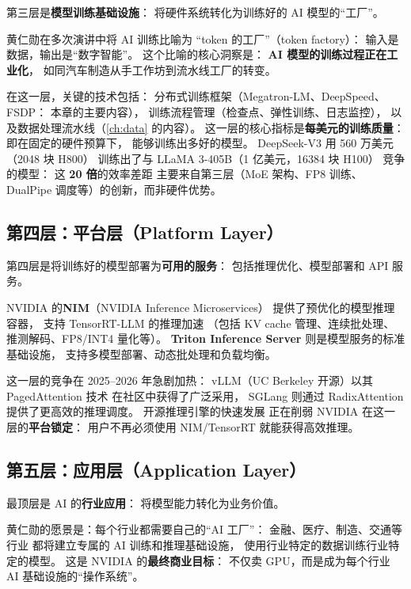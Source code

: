 第三层是\textbf{模型训练基础设施}：
将硬件系统转化为训练好的 AI 模型的“工厂”。

黄仁勋在多次演讲中将 AI 训练比喻为
“token 的工厂”（token factory）：
输入是数据，输出是“数字智能”。
这个比喻的核心洞察是：
\textbf{AI 模型的训练过程正在工业化}，
如同汽车制造从手工作坊到流水线工厂的转变。

在这一层，关键的技术包括：
分布式训练框架（Megatron-LM、DeepSpeed、FSDP：
本章的主要内容），
训练流程管理（检查点、弹性训练、日志监控），
以及数据处理流水线（\cref{ch:data} 的内容）。
这一层的核心指标是\textbf{每美元的训练质量}：
即在固定的硬件预算下，
能够训练出多好的模型。
DeepSeek-V3 用 560 万美元（2048 块 H800）
训练出了与 LLaMA 3-405B（1 亿美元，16384 块 H100）
竞争的模型：
这 \textbf{20 倍}的效率差距
主要来自第三层（MoE 架构、FP8 训练、
DualPipe 调度等）的创新，而非硬件优势。

\subsection{第四层：平台层（Platform Layer）}

第四层是将训练好的模型部署为\textbf{可用的服务}：
包括推理优化、模型部署和 API 服务。

NVIDIA 的\textbf{NIM}（NVIDIA Inference Microservices）
提供了预优化的模型推理容器，
支持 TensorRT-LLM 的推理加速
（包括 KV cache 管理、连续批处理、
推测解码、FP8/INT4 量化等）。
\textbf{Triton Inference Server}
则是模型服务的标准基础设施，
支持多模型部署、动态批处理和负载均衡。

这一层的竞争在 2025--2026 年急剧加热：
vLLM（UC Berkeley 开源）以其 PagedAttention 技术
在社区中获得了广泛采用，
SGLang 则通过 RadixAttention 提供了更高效的推理调度。
开源推理引擎的快速发展
正在削弱 NVIDIA 在这一层的\textbf{平台锁定}：
用户不再必须使用 NIM/TensorRT 就能获得高效推理。

\subsection{第五层：应用层（Application Layer）}

最顶层是 AI 的\textbf{行业应用}：
将模型能力转化为业务价值。

黄仁勋的愿景是：每个行业都需要自己的“AI 工厂”：
金融、医疗、制造、交通等行业
都将建立专属的 AI 训练和推理基础设施，
使用行业特定的数据训练行业特定的模型。
这是 NVIDIA 的\textbf{最终商业目标}：
不仅卖 GPU，而是成为每个行业
AI 基础设施的“操作系统”。

